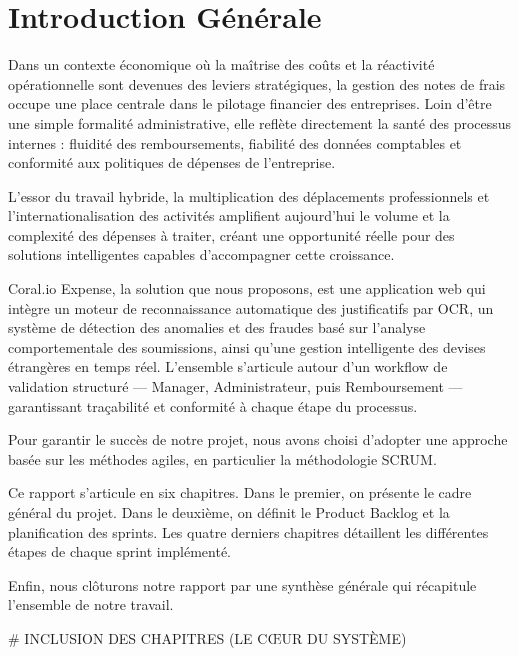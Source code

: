 \documentclass[12pt,a4paper]{report}
\begin{document}
\chapter*{Introduction Générale}

Dans un contexte économique où la maîtrise des coûts et la réactivité opérationnelle sont devenues des leviers stratégiques, la gestion des notes de frais occupe une place centrale dans le pilotage financier des entreprises. Loin d'être une simple formalité administrative, elle reflète directement la santé des processus internes : fluidité des remboursements, fiabilité des données comptables et conformité aux politiques de dépenses de l'entreprise.

L'essor du travail hybride, la multiplication des déplacements professionnels et l'internationalisation des activités amplifient aujourd'hui le volume et la complexité des dépenses à traiter, créant une opportunité réelle pour des solutions intelligentes capables d'accompagner cette croissance.

Coral.io Expense, la solution que nous proposons, est une application web qui intègre un moteur de reconnaissance automatique des justificatifs par OCR, un système de détection des anomalies et des fraudes basé sur l'analyse comportementale des soumissions, ainsi qu'une gestion intelligente des devises étrangères en temps réel. L'ensemble s'articule autour d'un workflow de validation structuré — Manager, Administrateur, puis Remboursement — garantissant traçabilité et conformité à chaque étape du processus.

Pour garantir le succès de notre projet, nous avons choisi d'adopter une approche basée sur les méthodes agiles, en particulier la méthodologie SCRUM.

Ce rapport s'articule en six chapitres. Dans le premier, on présente le cadre général du projet. Dans le deuxième, on définit le Product Backlog et la planification des sprints. Les quatre derniers chapitres détaillent les différentes étapes de chaque sprint implémenté.

Enfin, nous clôturons notre rapport par une synthèse générale qui récapitule l'ensemble de notre travail.

# INCLUSION DES CHAPITRES (LE CŒUR DU SYSTÈME)







\end{document}
